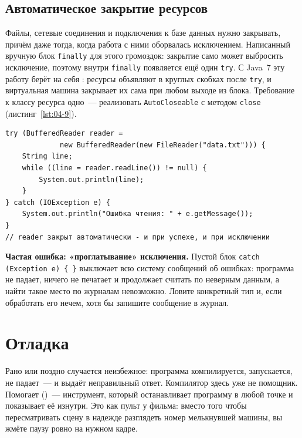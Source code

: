 \subsection{Автоматическое закрытие ресурсов}

Файлы, сетевые соединения и подключения к базе данных нужно закрывать, причём
даже тогда, когда работа с ними оборвалась исключением. Написанный вручную блок
\texttt{finally} для этого громоздок: закрытие само может выбросить исключение,
поэтому внутри \texttt{finally} появляется ещё один \texttt{try}. С Java~7 эту
работу берёт на себя : ресурсы объявляют в круглых
скобках после \texttt{try}, и виртуальная машина закрывает их сама при любом
выходе из блока. Требование к классу ресурса одно~--- реализовать
\texttt{AutoCloseable} с методом \texttt{close} (листинг~\ref{lst:04-9}).

\begin{listing}[H]
\begin{verbatim}
try (BufferedReader reader =
             new BufferedReader(new FileReader("data.txt"))) {
    String line;
    while ((line = reader.readLine()) != null) {
        System.out.println(line);
    }
} catch (IOException e) {
    System.out.println("Ошибка чтения: " + e.getMessage());
}
// reader закрыт автоматически - и при успехе, и при исключении
\end{verbatim}
\caption{Чтение файла через try-with-resources}
\label{lst:04-9}
\end{listing}

\begin{oshibka}
\textbf{Частая ошибка: «проглатывание» исключения.} Пустой блок
\texttt{catch (Exception e) \{ \}} выключает всю систему сообщений об ошибках:
программа не падает, ничего не печатает и продолжает считать по неверным
данным, а найти такое место по журналам невозможно. Ловите конкретный тип и,
если обработать его нечем, хотя бы запишите сообщение в журнал.
\end{oshibka}

\section{Отладка}

Рано или поздно случается неизбежное: программа компилируется, запускается, не
падает~--- и выдаёт неправильный ответ. Компилятор здесь уже не помощник.
Помогает  ()~--- инструмент, который останавливает
программу в любой точке и показывает её изнутри. Это как пульт у фильма: вместо
того чтобы пересматривать сцену в надежде разглядеть номер мелькнувшей машины,
вы жмёте паузу ровно на нужном кадре.

